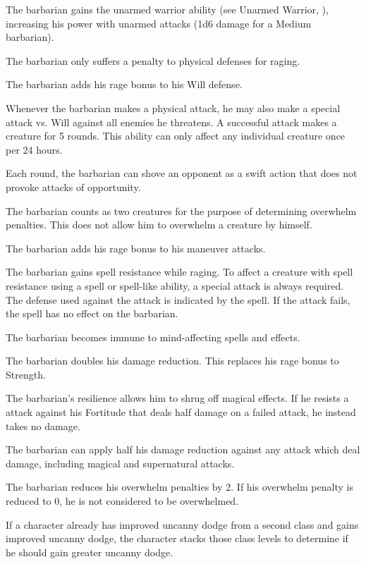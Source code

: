  The barbarian gains the unarmed warrior ability (see Unarmed Warrior, ), increasing his power with unarmed attacks (1d6 damage for a Medium barbarian).

 The barbarian only suffers a  penalty to physical defenses for raging.

 The barbarian adds his rage bonus to his Will defense.

 Whenever the barbarian makes a physical attack, he may also make a special attack vs. Will against all enemies he threatens. A successful attack makes a creature \shaken for 5 rounds. This ability can only affect any individual creature once per 24 hours.

 Each round, the barbarian can shove an opponent as a swift action that does not provoke attacks of opportunity.

 The barbarian counts as two creatures for the purpose of determining overwhelm penalties. This does not allow him to overwhelm a creature by himself.

 The barbarian adds his rage bonus to his maneuver attacks.

 The barbarian gains spell resistance while raging. To affect a creature with spell resistance using a spell or spell-like ability, a special attack is always required. The defense used against the attack is indicated by the spell. If the attack fails, the spell has no effect on the barbarian.

 The barbarian becomes immune to mind-affecting spells and effects.

 The barbarian doubles his damage reduction. This replaces his rage bonus to Strength.

 The barbarian's resilience allows him to shrug off magical effects. If he resists a attack against his Fortitude that deals half damage on a failed attack, he instead takes no damage.

 The barbarian can apply half his damage reduction against any attack which deal damage, including magical and supernatural attacks.

 The barbarian reduces his overwhelm penalties by 2. If his overwhelm penalty is reduced to 0, he is not considered to be overwhelmed.
\par If a character already has improved uncanny dodge from a second class and gains improved uncanny dodge, the character stacks those class levels to determine if he should gain greater uncanny dodge.

